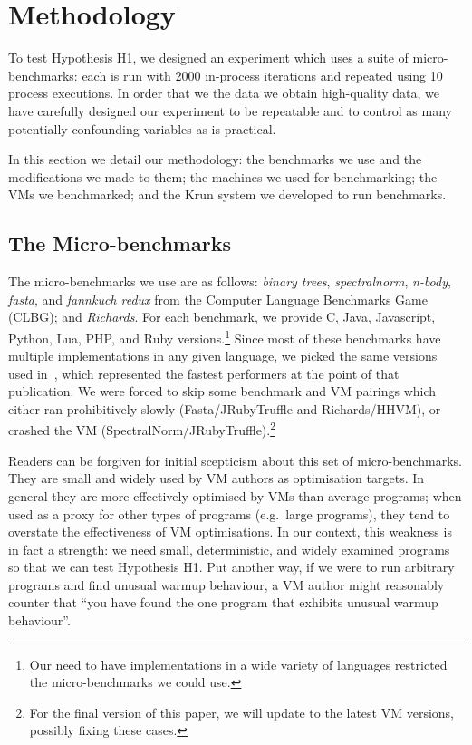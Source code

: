 \documentclass[a4paper,UKenglish]{lipics}
\newcommand{\krun}{Krun\xspace}
\newcommand{\hypone}{H1\xspace}
\newcommand{\binarytrees}{\emph{binary trees}\xspace}
\newcommand{\richards}{\emph{Richards}\xspace}
\newcommand{\spectralnorm}{\emph{spectralnorm}\xspace}
\newcommand{\nbody}{\emph{n-body}\xspace}
\newcommand{\fasta}{\emph{fasta}\xspace}
\newcommand{\fannkuch}{\emph{fannkuch redux}\xspace}
\begin{document}
\section{Methodology}
\label{sec:methodology}

To test Hypothesis H1, we designed an experiment which uses a suite of
micro-benchmarks: each is run with 2000 in-process iterations and repeated
using 10 process executions. In order
that we the data we obtain high-quality data, we have carefully designed our
experiment to be repeatable and to control as many potentially confounding variables as
is practical.

In this section we detail our methodology: the benchmarks we use and the
modifications we made to them; the machines we used for benchmarking; the VMs we
benchmarked; and the \krun system we developed to run benchmarks.


\subsection{The Micro-benchmarks}

The micro-benchmarks we use are as follows: \binarytrees, \spectralnorm, \nbody,
\fasta, and \fannkuch from the Computer Language Benchmarks Game (CLBG); and
\richards. For each benchmark, we provide C, Java, Javascript, Python, Lua, PHP,
and Ruby versions.\footnote{Our need to have implementations in a wide variety
of languages restricted the micro-benchmarks we could use.} Since most of these
benchmarks have multiple implementations in any given language, we picked
the same versions used in~\cite{bolz14impact}, which represented the fastest
performers at the point of that publication. We were forced to skip some
benchmark and VM pairings which either ran prohibitively slowly
(Fasta/JRubyTruffle and Richards/HHVM), or crashed the VM
(SpectralNorm/JRubyTruffle).\footnote{For the final version of this paper, we
will update to the latest VM versions, possibly fixing these cases.}

Readers can be forgiven for initial scepticism about this set of micro-benchmarks.
They are small and widely
used by VM authors as optimisation targets. In general they are more effectively
optimised by VMs than average programs; when used as a proxy for other types
of programs (e.g.~large programs), they tend to overstate the effectiveness of
VM optimisations. In our context, this weakness is in fact a strength: we need
small, deterministic, and widely examined programs so that we can test
Hypothesis \hypone. Put another way, if we were to run arbitrary programs
and find unusual warmup behaviour, a VM author might reasonably counter that
``you have found the one program that exhibits unusual warmup behaviour''.
\end{document}
